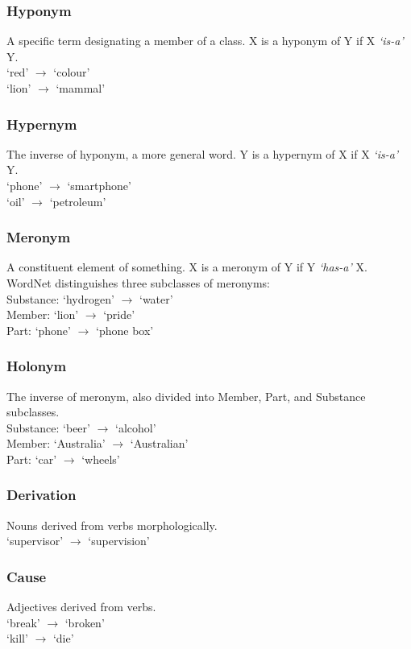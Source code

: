 \subsubsection{Hyponym} 
A specific term designating a member of a class. X is a hyponym of Y if X \textit{`is-a'} Y. \\ 
`red' $\rightarrow$ `colour' \\
`lion' $\rightarrow$ `mammal'

\subsubsection{Hypernym} 
The inverse of hyponym, a more general word. Y is a hypernym of X if X \textit{`is-a'} Y. \\
`phone' $\rightarrow$ `smartphone' \\
`oil' $\rightarrow$ `petroleum'

\subsubsection{Meronym} 
A constituent element of something. X is a meronym of Y if Y \textit{`has-a'} X. \\
WordNet distinguishes three subclasses of meronyms: \\
Substance: `hydrogen' $\rightarrow$ `water' \\
Member: `lion' $\rightarrow$ `pride' \\
Part: `phone' $\rightarrow$ `phone box'

\subsubsection{Holonym}
The inverse of meronym, also divided into Member, Part, and Substance subclasses. \\
Substance: `beer' $\rightarrow$ `alcohol' \\
Member: `Australia' $\rightarrow$ `Australian' \\
Part: `car' $\rightarrow$ `wheels'

\subsubsection{Derivation}
Nouns derived from verbs morphologically. \\
`supervisor' $\rightarrow$ `supervision'

\subsubsection{Cause}
Adjectives derived from verbs. \\
`break' $\rightarrow$ `broken' \\
`kill' $\rightarrow$ `die'

